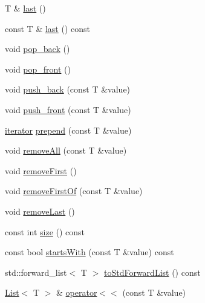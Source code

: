 \begin{DoxyCompactItemize}
\item 
T \& \hyperlink{classprism_1_1containers_1_1_list_ad49c24e7772a066c684e46e95822f9ce}{last} ()
\item 
const T \& \hyperlink{classprism_1_1containers_1_1_list_aa710f69ae116914b70d14f77566c610a}{last} () const 
\item 
void \hyperlink{classprism_1_1containers_1_1_list_a771d12f853d80247f8c9b10cd047da37}{pop\+\_\+back} ()
\item 
void \hyperlink{classprism_1_1containers_1_1_list_af75089c107fc31c602ace1b60b5ddeaa}{pop\+\_\+front} ()
\item 
void \hyperlink{classprism_1_1containers_1_1_list_a54efaef0d1bc7c0f6dc3b22cb7e37c9c}{push\+\_\+back} (const T \&value)
\item 
void \hyperlink{classprism_1_1containers_1_1_list_a0239344b13433e0fc7afb2b251fffe6f}{push\+\_\+front} (const T \&value)
\item 
\hyperlink{classprism_1_1containers_1_1_list_af3a4f72e9b96d080fe64d1803c91c7f8}{iterator} \hyperlink{classprism_1_1containers_1_1_list_ab9f116ffab28654029ff19ec0a538ca7}{prepend} (const T \&value)
\item 
void \hyperlink{classprism_1_1containers_1_1_list_a8e480351b98276da8fb71d16a7d95ae8}{remove\+All} (const T \&value)
\item 
void \hyperlink{classprism_1_1containers_1_1_list_a15a535214d35ee28ef09fafa0fcf0ce8}{remove\+First} ()
\item 
void \hyperlink{classprism_1_1containers_1_1_list_a7af38d1a27f700c6e5bf20cdae4866b1}{remove\+First\+Of} (const T \&value)
\item 
void \hyperlink{classprism_1_1containers_1_1_list_aa7309854e3e20f12f3c0da9bd780a2b8}{remove\+Last} ()
\item 
const int \hyperlink{classprism_1_1containers_1_1_list_ac85e533ea3e53efcbba0003725f15b5a}{size} () const 
\item 
const bool \hyperlink{classprism_1_1containers_1_1_list_aed2ef7316203fb0c0308991d62b8d3ae}{starts\+With} (const T \&value) const 
\item 
std\+::forward\+\_\+list$<$ T $>$ \hyperlink{classprism_1_1containers_1_1_list_ac8b0490456a04d249a29c14487d310f8}{to\+Std\+Forward\+List} () const 
\item 
\hyperlink{classprism_1_1containers_1_1_list}{List}$<$ T $>$ \& \hyperlink{classprism_1_1containers_1_1_list_a5a0d21cc245c0021f60202f886ce0366}{operator$<$$<$} (const T \&value)
\item 

\end{DoxyCompactItemize}
